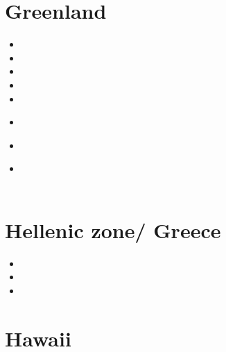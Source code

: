 \section{Greenland}

\begin{small}
\begin{itemize}
\item[\nineteenninetyseven]
\item[\twothousandeleven]
\item[\twothousandtwelve]
\item[\twothousandthirteen]
\item[\twothousandfourteen]
\item[\twothousandfifteen]
 \\
\item[\twothousandseventeen]
\item[\twothousandnineteen]
 \\
 \\
\end{itemize}
\end{small}


\section{Hellenic zone/ Greece}

\begin{small}
\begin{itemize}
\item[\nineteeneightyeight] 
\item[\twothousandthirteen]
\item[\twothousandfourteen]
\end{itemize}
\end{small}

\section{Hawaii}

